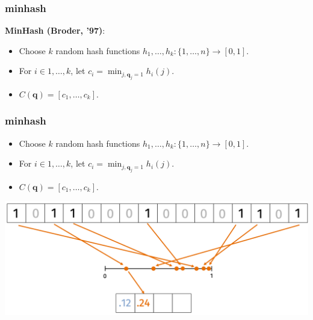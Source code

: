 \documentclass[handout,compress]{beamer}
\newcommand{\bv}[1]{\mathbf{#1}}
\begin{document}
\begin{frame}
	\frametitle{minhash}
	\textbf{MinHash (Broder, '97)}:
	\begin{itemize}
		\item Choose $k$ random hash functions $h_1, \ldots, h_k: \{1,\ldots, n\} \rightarrow [0,1]$. 
		\item For $i\in 1, \ldots,k$, let $c_i = \min_{j, \bv{q}_j = 1} h_i(j)$.
		\item $C(\bv{q}) = [c_1, \ldots, c_k]$.
	\end{itemize}
\end{frame}

\begin{frame}
	\frametitle{minhash}
	\begin{itemize}
		\item Choose $k$ random hash functions $h_1, \ldots, h_k: \{1,\ldots, n\} \rightarrow [0,1]$. 
		\item For $i\in 1, \ldots,k$, let $c_i = \min_{j, \bv{q}_j = 1} h_i(j)$.
		\item $C(\bv{q}) = [c_1, \ldots, c_k]$.
	\end{itemize}
	\begin{center}
		\includegraphics[width=\textwidth]{minHash2.png}	
	\end{center}
\end{frame}
\end{document}
